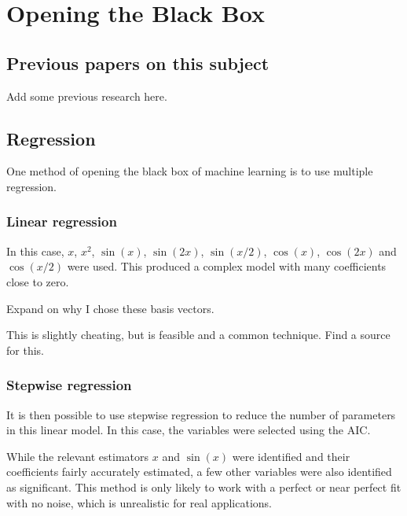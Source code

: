 
\chapter{Opening the Black Box}

\section{Previous papers on this subject}

\begin{todo}
	Add some previous research here.
\end{todo}

\section{Regression}

One method of opening the black box of machine learning is to use multiple regression.

\subsection{Linear regression}

In this case, \(x\), \(x^2\), \(\sin(x)\), \(\sin(2x)\), \(\sin(x/2)\), \(\cos(x)\), \(\cos(2x)\) and \(\cos(x/2)\) were used.
This produced a complex model with many coefficients close to zero.

\begin{todo}
	Expand on why I chose these basis vectors.
\end{todo}


\begin{todo}
	This is slightly cheating, but is feasible and a common technique. Find a source for this.
\end{todo}

\subsection{Stepwise regression}

It is then possible to use stepwise regression to reduce the number of parameters in this linear model.
In this case, the variables were selected using the \ac{AIC}.


While the relevant estimators \(x\) and \(\sin(x)\) were identified and their coefficients fairly accurately estimated, a few other variables were also identified as significant.
This method is only likely to work with a perfect or near perfect fit with no noise, which is unrealistic for real applications.

